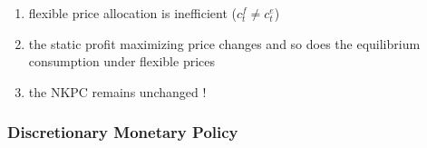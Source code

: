 \documentclass{article}
\begin{document}
\begin{shortbox}
    \begin{enumerate}
        \item flexible price allocation is inefficient ($c_t^f \neq c_t^e$)
        \item the static profit maximizing price changes and so does the equilibrium consumption under flexible prices
        \item the NKPC remains unchanged ! 
    \end{enumerate}
\end{shortbox}

\subsubsection{Discretionary Monetary Policy}
\end{document}
